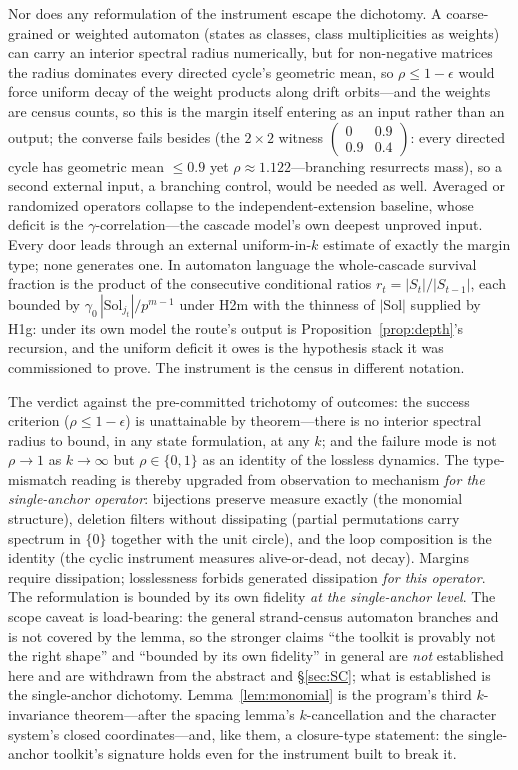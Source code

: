 \documentclass[11pt,a4paper]{article}
\numberwithin{equation}{section}
\theoremstyle{plain}
\theoremstyle{definition}
\theoremstyle{remark}
\begin{document}
Nor does any reformulation of the instrument escape the dichotomy. A
coarse-grained or weighted automaton (states as classes, class
multiplicities as weights) can carry an interior spectral radius
numerically, but for non-negative matrices the radius dominates every
directed cycle's geometric mean, so $\rho\le 1-\epsilon$ would force
uniform decay of the weight products along drift orbits---and the
weights are census counts, so this is the margin itself entering as an
input rather than an output; the converse fails besides (the $2\times2$
witness $\left(\begin{smallmatrix}0&0.9\\0.9&0.4\end{smallmatrix}
\right)$: every directed cycle has geometric mean $\le 0.9$ yet
$\rho\approx 1.122$---branching resurrects mass), so a second external
input, a branching control, would be needed as well. Averaged or
randomized operators collapse to the independent-extension baseline,
whose deficit is the $\gamma$-correlation---the cascade model's own
deepest unproved input. Every door leads through an external
uniform-in-$k$ estimate of exactly the margin type; none generates
one. In automaton language the whole-cascade survival fraction is the
product of the consecutive conditional ratios $r_t=|S_t|/|S_{t-1}|$,
each bounded by $\gamma_0\,|\mathrm{Sol}_{j_t}|/p^{m-1}$ under H2m
with the thinness of $|\mathrm{Sol}|$ supplied by H1g: under its own
model the route's output is Proposition~\ref{prop:depth}'s recursion,
and the uniform deficit it owes is the hypothesis stack it was
commissioned to prove. The instrument is the census in different
notation.

The verdict against the pre-committed trichotomy of outcomes: the
success criterion ($\rho\le 1-\epsilon$) is unattainable by
theorem---there is no interior spectral radius to bound, in any state
formulation, at any $k$; and the failure mode is not $\rho\to 1$ as
$k\to\infty$ but $\rho\in\{0,1\}$ as an identity of the lossless
dynamics. The type-mismatch reading is thereby upgraded from
observation to mechanism \emph{for the single-anchor operator}: bijections
preserve measure exactly (the monomial structure), deletion filters
without dissipating (partial permutations carry spectrum in $\{0\}$
together with the unit circle), and the loop composition is the identity
(the cyclic instrument measures alive-or-dead, not decay). Margins require
dissipation; losslessness forbids generated dissipation \emph{for this
operator}. The reformulation is bounded by its own fidelity \emph{at the
single-anchor level}. The scope caveat is load-bearing: the general
strand-census automaton branches and is not covered by the lemma, so the
stronger claims ``the toolkit is provably not the right shape'' and
``bounded by its own fidelity'' in general are \emph{not} established
here and are withdrawn from the abstract and \S\ref{sec:SC}; what is
established is the single-anchor dichotomy. Lemma~\ref{lem:monomial} is
the program's third $k$-invariance theorem---after the spacing lemma's
$k$-cancellation and the character system's closed coordinates---and,
like them, a closure-type statement: the single-anchor toolkit's signature
holds even for the instrument built to break it.
\end{document}

